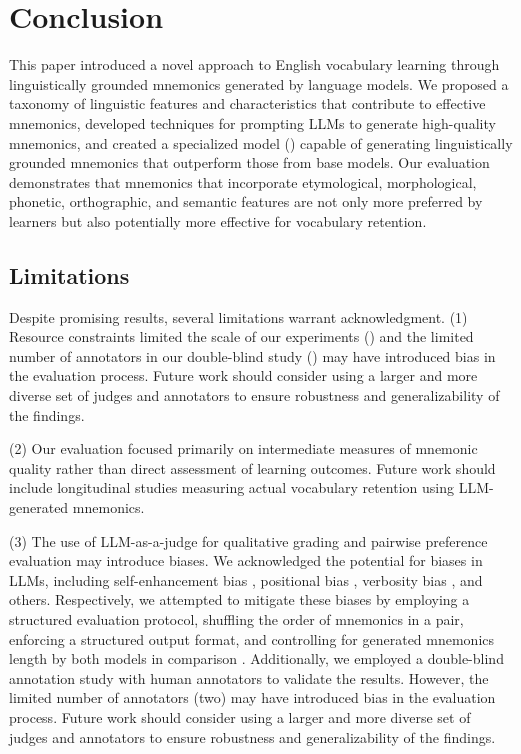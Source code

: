 \section{Conclusion} \label{sec:conclusion}
This paper introduced a novel approach to English vocabulary learning through linguistically grounded mnemonics generated by language models. We proposed a taxonomy of linguistic features and characteristics that contribute to effective mnemonics, developed techniques for prompting LLMs to generate high-quality mnemonics, and created a specialized model (\linksys) capable of generating linguistically grounded mnemonics that outperform those from base models. Our evaluation demonstrates that mnemonics that incorporate etymological, morphological, phonetic, orthographic, and semantic features are not only more preferred by learners but also potentially more effective for vocabulary retention.

\subsection{Limitations} \label{sec:limitations}
Despite promising results, several limitations warrant acknowledgment. (1) Resource constraints limited the scale of our experiments () and the limited number of annotators in our double-blind study () may have introduced bias in the evaluation process. Future work should consider using a larger and more diverse set of judges and annotators to ensure robustness and generalizability of the findings.

(2) Our evaluation focused primarily on intermediate measures of mnemonic quality rather than direct assessment of learning outcomes. Future work should include longitudinal studies measuring actual vocabulary retention using LLM-generated mnemonics.

(3) The use of LLM-as-a-judge for qualitative grading and pairwise preference evaluation may introduce biases. We acknowledged the potential for biases in LLMs, including self-enhancement bias \citep{panicksseryLLMEvaluatorsRecognize2024}, positional bias \citep{wangNotFairEvaluators2024,zhengJudgingLLMasajudgeMTbench2023}, verbosity bias \citep{zhengJudgingLLMasajudgeMTbench2023}, and others. Respectively, we attempted to mitigate these biases by employing a structured evaluation protocol, shuffling the order of mnemonics in a pair, enforcing a structured output format, and controlling for generated mnemonics length by both models in comparison \citep{guSurveyLLMasaJudge2025}. Additionally, we employed a double-blind annotation study with human annotators to validate the results. However, the limited number of annotators (two) may have introduced bias in the evaluation process. Future work should consider using a larger and more diverse set of judges and annotators to ensure robustness and generalizability of the findings.

